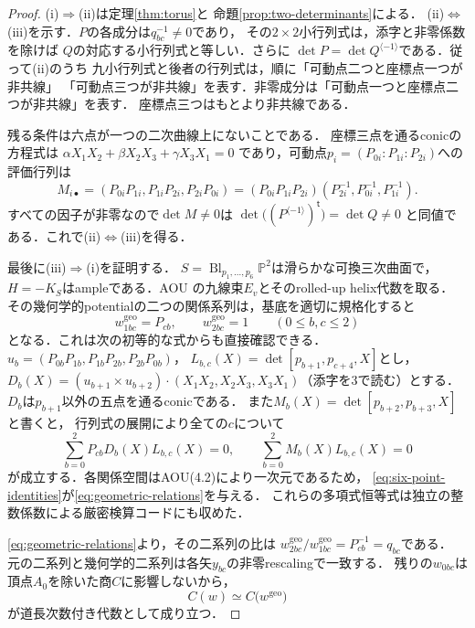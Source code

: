 \begin{proof}
(i)$\Rightarrow$(ii)は定理\ref{thm:torus}と
命題\ref{prop:two-determinants}による．
(ii)$\Leftrightarrow$(iii)を示す．$P$の各成分は$q_{bc}^{-1}\ne0$であり，
その$2\times2$小行列式は，添字と非零係数を除けば
$Q$の対応する小行列式と等しい．さらに
$\det P=\det Q^{\langle-1\rangle}$である．従って(ii)のうち
九小行列式と後者の行列式は，順に「可動点二つと座標点一つが非共線」
「可動点三つが非共線」を表す．非零成分は「可動点一つと座標点二つが非共線」を表す．
座標点三つはもとより非共線である．

残る条件は六点が一つの二次曲線上にないことである．
座標三点を通るconicの方程式は
$\alpha X_1X_2+\beta X_2X_3+\gamma X_3X_1=0$
であり，可動点$p_i=(P_{0i}:P_{1i}:P_{2i})$への評価行列は
\[
 M_{i\bullet}=(P_{0i}P_{1i},P_{1i}P_{2i},P_{2i}P_{0i})
 =(P_{0i}P_{1i}P_{2i})
 (P_{2i}^{-1},P_{0i}^{-1},P_{1i}^{-1}).
\]
すべての因子が非零なので$\det M\ne0$は
$\det\bigl((P^{\langle-1\rangle})^{\mathsf t}\bigr)=\det Q\ne0$
と同値である．これで(ii)$\Leftrightarrow$(iii)を得る．

最後に(iii)$\Rightarrow$(i)を証明する．
$S=\operatorname{Bl}_{p_1,\ldots,p_6}\mathbb P^2$は滑らかな可換三次曲面で，
$H=-K_S$はampleである．AOU\cite[\S\S4,8，特に(4.1)，(4.7)，(4.9)，(8.4)--(8.7)]{AOU}
の九線束$E_v$とそのrolled-up helix代数を取る．
その幾何学的potentialの二つの関係系列は，基底を適切に規格化すると
\begin{equation}\label{eq:geometric-relations}
 w^{\mathrm{geo}}_{1bc}=P_{cb},\qquad
 w^{\mathrm{geo}}_{2bc}=1\qquad(0\le b,c\le2)
\end{equation}
となる．これは次の初等的な式からも直接確認できる．
$u_b=(P_{0b}P_{1b},P_{1b}P_{2b},P_{2b}P_{0b})$，
$L_{b,c}(X)=\det[p_{b+1},p_{c+4},X]$とし，
$D_b(X)=(u_{b+1}\times u_{b+2})\cdot
(X_1X_2,X_2X_3,X_3X_1)$（添字を$3$で読む）とする．
$D_b$は$p_{b+1}$以外の五点を通るconicである．
また$M_b(X)=\det[p_{b+2},p_{b+3},X]$と書くと，
行列式の展開により全ての$c$について
\begin{equation}\label{eq:six-point-identities}
 \sum_{b=0}^2P_{cb}D_b(X)L_{b,c}(X)=0,\qquad
 \sum_{b=0}^2M_b(X)L_{b,c}(X)=0
\end{equation}
が成立する．各関係空間はAOU(4.2)により一次元であるため，
\eqref{eq:six-point-identities}が\eqref{eq:geometric-relations}を与える．
これらの多項式恒等式は独立の整数係数による厳密検算コードにも収めた．

\eqref{eq:geometric-relations}より，その二系列の比は
$w^{\mathrm{geo}}_{2bc}/w^{\mathrm{geo}}_{1bc}
=P_{cb}^{-1}=q_{bc}$である．
元の二系列と幾何学的二系列は各矢$y_{bc}$の非零rescalingで一致する．
残りの$w_{0bc}$は頂点$A_0$を除いた商$C$に影響しないから，
\[
 C(w)\simeq C\bigl(w^{\mathrm{geo}}\bigr)
\]
が道長次数付き代数として成り立つ．


\end{proof}
